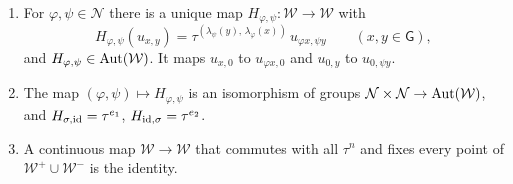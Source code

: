 \begin{theorem}\label{cl:thm:95W}
\leavevmode
\begin{enumerate}
\item[(a)] For $\varphi,\psi\in\mathcal N$ there is a unique map $H_{\varphi,\psi}\colon\mathcal W\to\mathcal W$ with
\[
H_{\varphi,\psi}(u_{x,y})=\tau^{(\lambda_\psi(y),\,\lambda_\varphi(x))}\,u_{\varphi x,\psi y}\qquad(x,y\in \mathsf G),
\]
and $H_{\varphi,\psi}\in\operatorname{Aut}(\mathcal W)$. It maps $u_{x,0}$ to $u_{\varphi x,0}$ and $u_{0,y}$ to $u_{0,\psi y}$.
\item[(b)] The map $(\varphi,\psi)\mapsto H_{\varphi,\psi}$ is an isomorphism of groups $\mathcal N\times\mathcal N\to\operatorname{Aut}(\mathcal W)$, and $H_{\sigma,\mathrm{id}}=\tau^{e_1}$, $H_{\mathrm{id},\sigma}=\tau^{e_2}$.
\item[(c)] A continuous map $\mathcal W\to\mathcal W$ that commutes with all $\tau^n$ and fixes every point of $\mathcal W^+\cup\mathcal W^-$ is the identity.
\end{enumerate}
\end{theorem}

